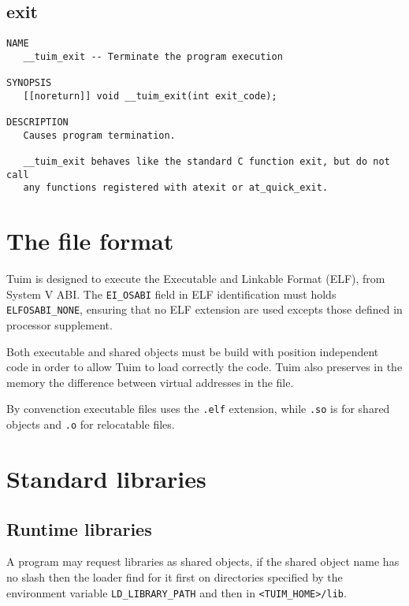 \documentclass[
   12pt,                         %
   openright,                    %
   twoside,                      %
   a4paper,                      %
   sumario = tradicional,        %
   english,                      %
   xcolor=table                  %
]{abntex2}
\begin{document}
\newpage
\section{exit}

\begin{verbatim}
NAME
   __tuim_exit -- Terminate the program execution

SYNOPSIS
   [[noreturn]] void __tuim_exit(int exit_code);

DESCRIPTION
   Causes program termination.

   __tuim_exit behaves like the standard C function exit, but do not call
   any functions registered with atexit or at_quick_exit.
\end{verbatim}


\chapter{The file format}

Tuim is designed to execute the
Executable and Linkable Format (ELF),
from System V\cite{systemv} ABI.
The \texttt{EI\_OSABI} field in ELF identification
must holds \texttt{ELFOSABI\_NONE},
ensuring that no ELF extension are used excepts those defined in
processor supplement.

Both executable and shared objects must be build
with position independent code in order to allow Tuim
to load correctly the code.
Tuim also preserves in the memory the
difference between virtual addresses in the file.

By convenction executable files uses the \texttt{.elf} extension,
while \texttt{.so} is for shared objects and
\texttt{.o} for relocatable files.

\chapter{Standard libraries}

\section{Runtime libraries}

A program may request libraries as shared objects,
if the shared object name has no slash then the loader find for it
first on directories specified by the environment variable
\texttt{LD\_LIBRARY\_PATH} and then in \texttt{<TUIM\_HOME>/lib}.
\end{document}

